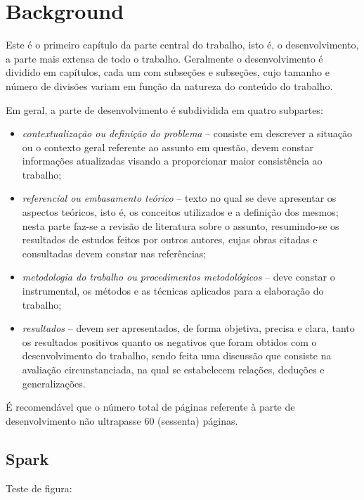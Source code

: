 \chapter{Background}

Este é o primeiro capítulo da parte central do trabalho, isto é, o desenvolvimento, a parte mais extensa de todo o trabalho. Geralmente o desenvolvimento é dividido em capítulos, cada um com subseções e subseções, cujo tamanho e número de divisões variam em função da natureza do conteúdo do trabalho.

Em geral, a parte de desenvolvimento é subdividida em quatro subpartes:

\begin{itemize}
   \item \textit{contextualização ou definição do problema} -- consiste em descrever a situação ou o contexto geral referente ao assunto em questão, devem constar informações atualizadas visando a proporcionar maior consistência ao trabalho;
   \item \textit{referencial ou embasamento teórico} -- texto no qual se deve apresentar os aspectos teóricos, isto é, os conceitos utilizados e a definição dos mesmos; nesta parte faz-se a revisão de literatura sobre o assunto, resumindo-se os resultados de estudos feitos por outros autores, cujas obras citadas e consultadas devem constar nas referências;
   \item \textit{metodologia do trabalho ou procedimentos metodológicos} -- deve constar o instrumental, os métodos e as técnicas aplicados para a elaboração do trabalho;
   \item \textit{resultados} -- devem ser apresentados, de forma objetiva, precisa e clara, tanto os resultados positivos quanto os negativos que foram obtidos com o desenvolvimento do trabalho, sendo feita uma discussão que consiste na avaliação circunstanciada, na qual se estabelecem relações, deduções e generalizações.
\end{itemize}

É recomendável que o número total de páginas referente à parte de desenvolvimento não ultrapasse 60 (sessenta) páginas.

\section{Spark}



Teste de figura:

